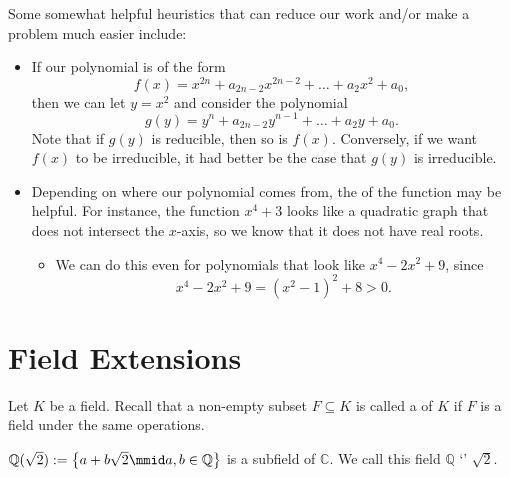 \documentclass[notoc,notitlepage,nobib]{tufte-book}
\begin{document}
Some somewhat helpful heuristics that can reduce our work and/or make a problem
much easier include:
\begin{itemize}
  \item If our polynomial is of the form
    \begin{equation*}
      f(x) = x^{2n} + a_{2n-2}x^{2n-2} + \hdots + a_{2}x^2 + a_0,
    \end{equation*}
    then we can let $y = x^2$ and consider the polynomial
    \begin{equation*}
      g(y) = y^n + a_{2n-2}y^{n-1} + \hdots + a_2y + a_0.
    \end{equation*}
    Note that if $g(y)$ is reducible, then so is $f(x)$. Conversely, if we want
    $f(x)$ to be irreducible, it had better be the case that $g(y)$ is
    irreducible.
  \item Depending on where our polynomial comes from, the  of the
    function may be helpful. For instance, the function $x^4 + 3$ looks like a
    quadratic graph that does not intersect the $x$-axis, so we know that it
    does not have real roots.
    \begin{itemize}
      \item We can do this even for polynomials that look like $x^4 - 2x^2 + 9$,
        since
        \begin{equation*}
          x^4 - 2x^2 + 9 = (x^2 - 1)^2 + 8 > 0.
        \end{equation*}
    \end{itemize}
\end{itemize}



\section{Field Extensions}%
\label{sec:field_extensions}

Let $K$ be a field. Recall that a non-empty subset $F \subseteq K$ is called a  of $K$
if $F$ is a field under the same operations.

\begin{eg}
  $\mathbb{Q}(\sqrt{2}) := \left\{ a + b\sqrt{2} \mmid a, b \in \mathbb{Q} \right\}$ is a subfield of
  $\mathbb{C}$. We call this field $\mathbb{Q}$ `' $\sqrt{2}$.
\end{eg}
\end{document}
